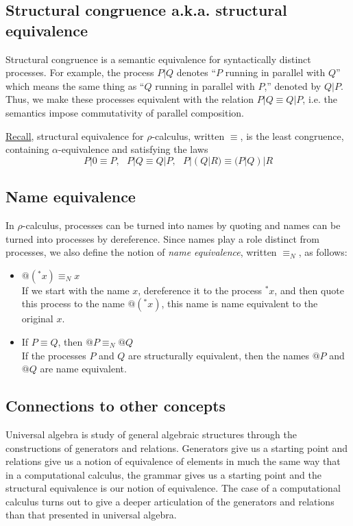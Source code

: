 \documentclass[12pt]{article}
\numberwithin{equation}{section}
\begin{document}
\subsection{Structural congruence a.k.a. structural equivalence}
Structural congruence is a semantic equivalence for syntactically distinct processes. For example, the process $P|Q$ denotes ``$P$ running in parallel with $Q$'' which means the same thing as ``$Q$ running in parallel with $P$,'' denoted by $Q|P$. Thus, we make these processes equivalent with the relation $P|Q \equiv Q|P$, i.e. the semantics impose commutativity of parallel composition.

\href{https://blog.rchain.coop/calculus-primer-\%cf\%81-calculus/}{Recall}, structural equivalence for $\rho$-calculus, written $\equiv$, is the least congruence, containing $\alpha$-equivalence and satisfying the laws
\[ P|0 \equiv P, \ \ \ P|Q \equiv Q|P, \ \ \ P|(Q|R) \equiv (P|Q)|R \]

\subsection{Name equivalence}
In $\rho$-calculus, processes can be turned into names by quoting and names can be turned into processes by dereference. Since names play a role distinct from processes, we also define the notion of \emph{name equivalence}, written $\equiv_N$, as follows:
\begin{itemize}
\item $@({}^*x) \equiv_N x$ \\
If we start with the name $x$, dereference it to the process ${}^*x$, and then quote this process to the name $@({}^*x)$, this name is name equivalent to the original $x$.

\item If $P \equiv Q$, then $@P \equiv_N @Q$ \\
If the processes $P$ and $Q$ are structurally equivalent, then the names $@P$ and $@Q$ are name equivalent.
\end{itemize}

\subsection{Connections to other concepts}
Universal algebra is study of general algebraic structures through the constructions of generators and relations. Generators give us a starting point and relations give us a notion of equivalence of elements in much the same way that in a computational calculus, the grammar gives us a starting point and the structural equivalence is our notion of equivalence. The case of a computational calculus turns out to give a deeper articulation of the generators and relations than that presented in universal algebra. 
\end{document}

